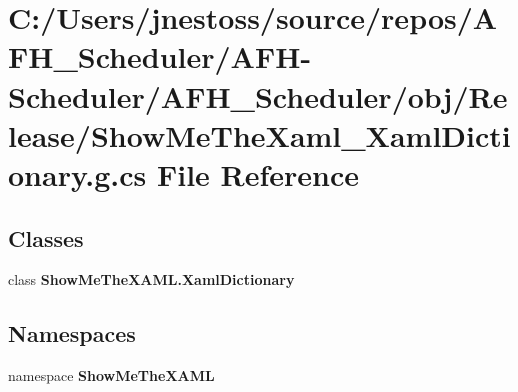 \section{C\+:/\+Users/jnestoss/source/repos/\+A\+F\+H\+\_\+\+Scheduler/\+A\+F\+H-\/\+Scheduler/\+A\+F\+H\+\_\+\+Scheduler/obj/\+Release/\+Show\+Me\+The\+Xaml\+\_\+\+Xaml\+Dictionary.g.\+cs File Reference}
\label{_release_2_show_me_the_xaml___xaml_dictionary_8g_8cs}
\subsection*{Classes}
\begin{DoxyCompactItemize}
\item 
class {\bfseries Show\+Me\+The\+X\+A\+M\+L.\+Xaml\+Dictionary}
\end{DoxyCompactItemize}
\subsection*{Namespaces}
\begin{DoxyCompactItemize}
\item 
namespace \textbf{ Show\+Me\+The\+X\+A\+ML}
\end{DoxyCompactItemize}
